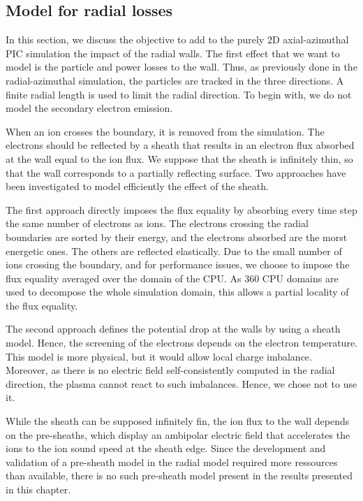 
\subsection{Model for radial losses} \label{subsec-fakeR}

In this section, we discuss the objective to add to the purely \ac{2D} axial-azimuthal \ac{PIC} simulation the impact of the radial walls.
The first effect that we want to model is the particle and power losses to the wall.
Thus, as previously done in the radial-azimuthal simulation, the particles are tracked in the three directions.
A finite radial length is used to limit the radial direction.
To begin with, we do not model the secondary electron emission.

When an ion crosses the boundary, it is removed from the simulation.
The electrons should be reflected by a sheath that results in an electron flux absorbed at the wall equal to the ion flux.
We suppose that the sheath is infinitely thin, so that the wall corresponds to a partially reflecting surface.
Two approaches have been investigated to model efficiently the effect of the sheath.

The first approach directly imposes the flux equality by absorbing every time step the same number of electrons as ions.
The electrons crossing the radial boundaries are sorted by their energy, and the electrons absorbed are the morst energetic ones.
The others are reflected elastically.
Due to the small number of ions crossing the boundary, and for performance issues, we choose to impose the flux equality averaged over the domain of the CPU.
As 360 CPU domains are used to decompose the whole simulation domain, this allows a partial locality of the flux equality. 

The second approach defines the potential drop at the walls by  using  a sheath model.
Hence, the screening of the electrons depends on the electron temperature.
This model is more physical, but it would allow local charge imbalance.
Moreover, as there is no electric field self-consistently computed in the radial direction, the plasma cannot react to such imbalances.
Hence, we chose not to use it.

\vspace{1ex}
While the sheath can be supposed infinitely fin, the ion flux to the wall depends on the pre-sheaths, which display an ambipolar electric field that accelerates the ions to the ion sound speed at the sheath edge.
Since the development and validation of a pre-sheath model in the radial model required more ressources than available, there is no such pre-sheath model present in the results presented in this chapter.

